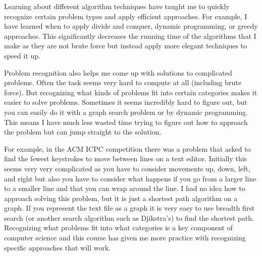 \documentclass{article}
\begin{document}
Learning about different algorithm techniques have taught me to quickly recognize certain problem types and apply efficient approaches. For example, I have learned when to apply divide and conquer, dynamic programming, or greedy approaches. This significantly decreases the running time of the algorithms that I make as they are not brute force but instead apply more elegant techniques to speed it up.

Problem recognition also helps me come up with solutions to complicated problems. Often the task seems very hard to compute at all (including brute force). But recognizing what kinds of problems fit into certain categories makes it easier to solve problems. Sometimes it seems incredibly hard to figure out, but you can easily do it with a graph search problem or by dynamic programming. This means I have much less wasted time trying to figure out how to approach the problem but can jump straight to the solution.

For example, in the ACM ICPC competition there was a problem that asked to find the fewest keystrokes to move between lines on a text editor. Initially this seems very very complicated as you have to consider movements up, down, left, and right but also you have to consider what happens if you go from a larger line to a smaller line and that you can wrap around the line. I had no idea how to approach solving this problem, but it is just a shortest path algorithm on a graph. If you represent the text file as a graph it is very easy to use breadth first search (or another search algorithm such as Djikstra's) to find the shortest path. Recognizing what problems fit into what categories is a key component of computer science and this course has given me more practice with recognizing specific approaches that will work. 
\end{document}

